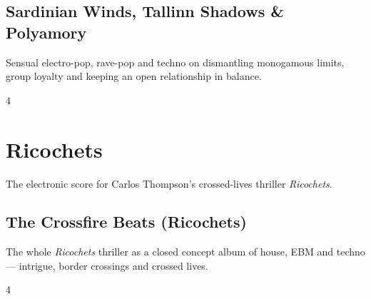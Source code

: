 \documentclass[a4paper,landscape]{memoir}
\begin{document}
\chapter{Sardinian Winds, Tallinn Shadows \& Polyamory}
Sensual electro-pop, rave-pop and techno on dismantling monogamous limits, group loyalty and keeping an open relationship in balance.
\clearpage\begin{multicols*}{4}
\end{multicols*}

\part{Ricochets}
The electronic score for Carlos Thompson’s crossed-lives thriller \emph{Ricochets}.

\chapter{The Crossfire Beats (Ricochets)}
The whole \emph{Ricochets} thriller as a closed concept album of house, EBM and techno — intrigue, border crossings and crossed lives.
\clearpage\begin{multicols*}{4}
\end{multicols*}
\end{document}
